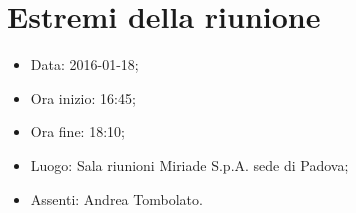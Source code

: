 \documentclass[../template.tex]{subfiles}
\begin{document}
\section{Estremi della riunione}
	\begin{itemize}
		\item Data: 2016-01-18;
		\item Ora inizio: 16:45;
		\item Ora fine: 18:10;
		\item Luogo: Sala riunioni Miriade S.p.A. sede di Padova;
		\item Assenti: Andrea Tombolato.
	\end{itemize}
\end{document}
